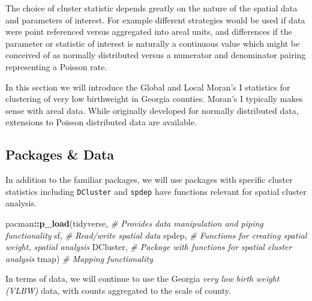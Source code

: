 \documentclass[
]{book}
\newenvironment{Shaded}{\begin{snugshade}}{\end{snugshade}}
\newcommand{\AttributeTok}[1]{\textcolor[rgb]{0.13,0.29,0.53}{#1}}
\newcommand{\CommentTok}[1]{\textcolor[rgb]{0.56,0.35,0.01}{\textit{#1}}}
\newcommand{\FunctionTok}[1]{\textcolor[rgb]{0.13,0.29,0.53}{\textbf{#1}}}
\newcommand{\NormalTok}[1]{#1}
\newcommand{\OtherTok}[1]{\textcolor[rgb]{0.56,0.35,0.01}{#1}}
\newcommand{\SpecialCharTok}[1]{\textcolor[rgb]{0.81,0.36,0.00}{\textbf{#1}}}
\newcommand{\StringTok}[1]{\textcolor[rgb]{0.31,0.60,0.02}{#1}}
\begin{document}
The choice of cluster statistic depends greatly on the nature of the spatial data and parameters of interest. For example different strategies would be used if data were point referenced versus aggregated into areal units, and differences if the parameter or statistic of interest is naturally a continuous value which might be conceived of as normally distributed versus a numerator and denominator pairing representing a Poisson rate.

In this section we will introduce the Global and Local Moran's I statistics for clustering of very low birthweight in Georgia counties. Moran's I typically makes sense with areal data. While originally developed for normally distributed data, extensions to Poisson distributed data are available.

\hypertarget{packages-data-1}{%
\subsection{Packages \& Data}\label{packages-data-1}}

In addition to the familiar packages, we will use packages with specific cluster statistics including \texttt{DCluster} and \texttt{spdep} have functions relevant for spatial cluster analysis.

\begin{Shaded}
\begin{Highlighting}[]
\NormalTok{pacman}\SpecialCharTok{::}\FunctionTok{p\_load}\NormalTok{(tidyverse, }\CommentTok{\# Provides data manipulation and piping functionality}
\NormalTok{               sf,        }\CommentTok{\# Read/write spatial data}
\NormalTok{               spdep,     }\CommentTok{\# Functions for creating spatial weight, spatial analysis}
\NormalTok{               DCluster,  }\CommentTok{\# Package with functions for spatial cluster analysis}
\NormalTok{               tmap)      }\CommentTok{\# Mapping functionality}
\end{Highlighting}
\end{Shaded}

In terms of data, we will continue to use the Georgia \emph{very low birth weight (VLBW)} data, with counts aggregated to the scale of county.

\begin{Shaded}
\end{Shaded}
\end{document}
